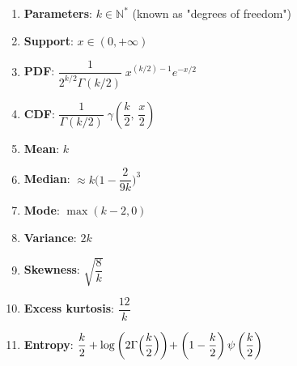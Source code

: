 \begin{enumerate}
    \item \textbf{Parameters}: ${\displaystyle k\in \mathbb {N} ^{*}}$ (known as "degrees of freedom")
    \hfill \cite{wiki/Chi-squared_distribution}

    \item \textbf{Support}: $  {\displaystyle x\in (0,+\infty )} $
    \hfill \cite{wiki/Chi-squared_distribution}

    \item \textbf{PDF}: $  {\displaystyle {\dfrac {1}{2^{k/2}\Gamma (k/2)}}\;x^{(k/2)-1}e^{-x/2}} $
    \hfill \cite{wiki/Chi-squared_distribution}

    \item \textbf{CDF}: $  {\displaystyle {\dfrac {1}{\Gamma (k/2)}}\;\gamma \left({\dfrac {k}{2}},\,{\dfrac {x}{2}}\right)\;} $
    \hfill \cite{wiki/Chi-squared_distribution}


    \item \textbf{Mean}: $ k $
    \hfill \cite{wiki/Chi-squared_distribution}

    \item \textbf{Median}: $  {\displaystyle \approx k{\bigg (}1-{\dfrac {2}{9k}}{\bigg )}^{3}\;} $
    \hfill \cite{wiki/Chi-squared_distribution}

    \item \textbf{Mode}: $  {\displaystyle \max(k-2,0)\;} $
    \hfill \cite{wiki/Chi-squared_distribution}

    \item \textbf{Variance}: $  {\displaystyle 2k\;} $
    \hfill \cite{wiki/Chi-squared_distribution}

    \item \textbf{Skewness}: $  {\displaystyle {\sqrt {\dfrac{8}{k}}}\,} $
    \hfill \cite{wiki/Chi-squared_distribution}

    \item \textbf{Excess kurtosis}: $  {\displaystyle {\dfrac {12}{k}}} $
    \hfill \cite{wiki/Chi-squared_distribution}

    \item \textbf{Entropy}: $  {\displaystyle {\dfrac {k}{2}} +\log \left(2\Gamma {\Bigl (}{\dfrac {k}{2}}{\Bigr )}\right) \!+\left(1-{\dfrac {k}{2}}\right)\psi \left({\dfrac {k}{2}}\right)} $
    \hfill \cite{wiki/Chi-squared_distribution}


\end{enumerate}

